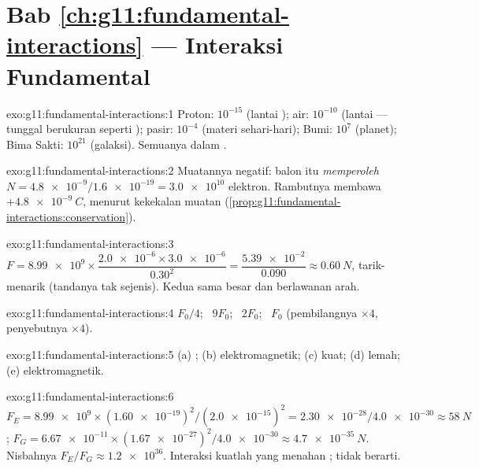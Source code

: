\section*{Bab \ref{ch:g11:fundamental-interactions} --- Interaksi Fundamental}

\begin{solution}{exo:g11:fundamental-interactions:1}
Proton: $10^{-15}$ (lantai );  air: $10^{-10}$ (lantai
 ---  tunggal berukuran seperti ); pasir: $10^{-4}$
(materi sehari-hari); Bumi: $10^{7}$ (planet); Bima Sakti: $10^{21}$
(galaksi). Semuanya dalam .
\end{solution}

\begin{solution}{exo:g11:fundamental-interactions:2}
Muatannya negatif: balon itu \emph{memperoleh}
$N = \num{4.8e-9}/\num{1.6e-19} = \num{3.0e10}$ elektron. Rambutnya
membawa $+\qty{4.8e-9}{C}$, menurut kekekalan muatan
(\cref{prop:g11:fundamental-interactions:conservation}).
\end{solution}

\begin{solution}{exo:g11:fundamental-interactions:3}
$F = \num{8.99e9} \times \dfrac{\num{2.0e-6} \times \num{3.0e-6}}{0.30^2}
= \dfrac{\num{5.39e-2}}{0.090} \approx \qty{0.60}{N}$, tarik-menarik
(tandanya tak sejenis). Kedua  sama besar dan berlawanan arah.
\end{solution}

\begin{solution}{exo:g11:fundamental-interactions:4}
$F_0/4$; \ $9F_0$; \ $2F_0$; \ $F_0$ (pembilangnya $\times 4$,
penyebutnya $\times 4$).
\end{solution}

\begin{solution}{exo:g11:fundamental-interactions:5}
(a) ; (b) elektromagnetik; (c) kuat; (d) lemah;
(e) elektromagnetik.
\end{solution}

\begin{solution}{exo:g11:fundamental-interactions:6}
$F_E = \num{8.99e9} \times (\num{1.60e-19})^2/(\num{2.0e-15})^2
= \num{2.30e-28}/\num{4.0e-30} \approx \qty{58}{N}$;
$F_G = \num{6.67e-11} \times (\num{1.67e-27})^2/\num{4.0e-30}
\approx \qty{4.7e-35}{N}$. Nisbahnya
$F_E/F_G \approx \num{1.2e36}$. Interaksi kuatlah yang menahan ;  tidak berarti.
\end{solution}

